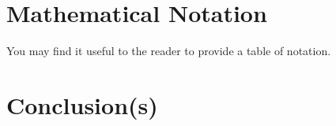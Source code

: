 \documentclass{bcthesis}
\begin{document}
\chapter{Mathematical Notation}%
\label{sec:mathematical-notation}

You may find it useful to the reader to provide a table of notation. 

\chapter{Conclusion(s)}


\backmatter

\nocite{*}


\end{document}
